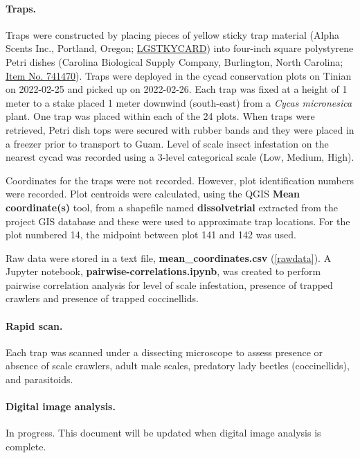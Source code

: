 \documentclass[12pt,letterpaper,english,bibliography=totocnumbered, abstract=on]{scrartcl}
\begin{document}
\paragraph{Traps.} Traps were constructed by placing pieces of yellow sticky trap material (Alpha Scents Inc., Portland, Oregon; \href{https://www.alphascents.com/large-10x16-sticky-rectangle-card-trap.html}{LGSTKYCARD}) into four-inch square polystyrene Petri dishes (Carolina Biological Supply Company, Burlington, North Carolina; \href{https://www.carolina.com/lab-dishes/polystyrene-square-integrid-petri-dish-pack-of-10/741470.pr}{Item No. 741470}). Traps were deployed in the cycad conservation plots on Tinian on 2022-02-25 and picked up on 2022-02-26. Each trap was fixed at a height of 1 meter to a stake placed 1 meter downwind (south-east) from a \textit{Cycas micronesica} plant. One trap was placed within each of the 24 plots. When traps were retrieved, Petri dish tops were secured with rubber bands and they were placed in a freezer prior to transport to Guam. Level of scale insect infestation on the nearest cycad was recorded using a 3-level categorical scale (Low, Medium, High).

Coordinates for the traps were not recorded. However, plot identification numbers were recorded. Plot centroids were calculated, using the QGIS \textbf{Mean coordinate(s)} tool, from a shapefile named \textbf{dissolvetrial} extracted from the project GIS database and these were used to approximate trap locations. For the plot numbered 14, the midpoint between plot 141 and 142 was used.

Raw data were stored in a text file, \textbf{mean\_coordinates.csv} (\ref{rawdata}). A Jupyter notebook, \textbf{pairwise-correlations.ipynb}, was created to perform pairwise correlation analysis for level of scale infestation, presence of trapped crawlers and presence of trapped coccinellids.

\paragraph{Rapid scan.} Each trap was scanned under a dissecting microscope to assess presence or absence of scale crawlers, adult male scales, predatory lady beetles (coccinellids), and parasitoids.

\paragraph{Digital image analysis.} In progress. This document will be updated when digital image analysis is complete.
\end{document}
